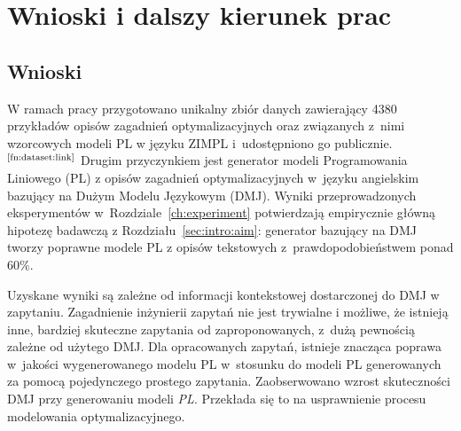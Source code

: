 
\chapter{Wnioski i dalszy kierunek prac}\label{ch:conclusions}

\section{Wnioski}

W ramach pracy przygotowano unikalny zbiór danych zawierający 4380 przykładów opisów zagadnień optymalizacyjnych oraz związanych z~nimi wzorcowych modeli PL w języku ZIMPL i~udostępniono go publicznie.$^\text{\ref{fn:dataset:link}}$ Drugim przyczynkiem jest generator modeli Programowania Liniowego (PL) z opisów zagadnień optymalizacyjnych w~języku angielskim bazujący na Dużym Modelu Językowym (DMJ). %
Wyniki przeprowadzonych eksperymentów w~Rozdziale~\ref{ch:experiment} potwierdzają empirycznie główną hipotezę badawczą z Rozdziału~\ref{sec:intro:aim}: generator bazujący na DMJ tworzy poprawne modele PL z opisów tekstowych z~prawdopodobieństwem ponad 60\%. %

Uzyskane wyniki są zależne od informacji kontekstowej dostarczonej do DMJ w zapytaniu. Zagadnienie inżynierii zapytań nie jest trywialne i możliwe, że istnieją inne, bardziej skuteczne zapytania od zaproponowanych, z~dużą pewnością zależne od użytego DMJ. 
Dla opracowanych zapytań, istnieje znacząca poprawa w~jakości wygenerowanego modelu PL w~stosunku do modeli PL generowanych za pomocą pojedynczego prostego zapytania. Zaobserwowano wzrost skuteczności DMJ przy generowaniu modeli \textit{PL}. Przekłada się to na usprawnienie procesu modelowania optymalizacyjnego. 

